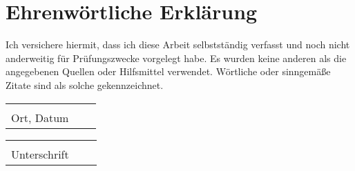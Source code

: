 \clearpage{}
\chapter*{Ehrenwörtliche Erklärung}
Ich versichere hiermit, dass ich diese Arbeit selbstständig verfasst und
noch nicht anderweitig für Prüfungszwecke vorgelegt habe. Es wurden keine anderen
als die angegebenen Quellen oder Hilfsmittel verwendet. Wörtliche oder
sinngemäße Zitate sind als solche gekennzeichnet.


\vspace{16,5 cm} 
\begin{tabular}{p{7cm}p{.5cm}l}
\dotfill \\ 
Ort, Datum
\end{tabular}
\hfill 
\begin{tabular}{p{7cm}p{.5cm}l}
\dotfill \\ 
Unterschrift 
\end{tabular}
